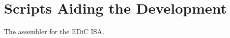 \chapter{Scripts Aiding the Development}
\begin{multipagecode}
  \caption{The assembler for the \gls{EDiC} \gls{ISA}.}
    \inputminted[linenos,
      breaklines,
      frame=leftline,
      xleftmargin=20pt,
    ]{TypeScript}{src/assembler.ts}
  \label{lst:app_assembler}
\end{multipagecode}

